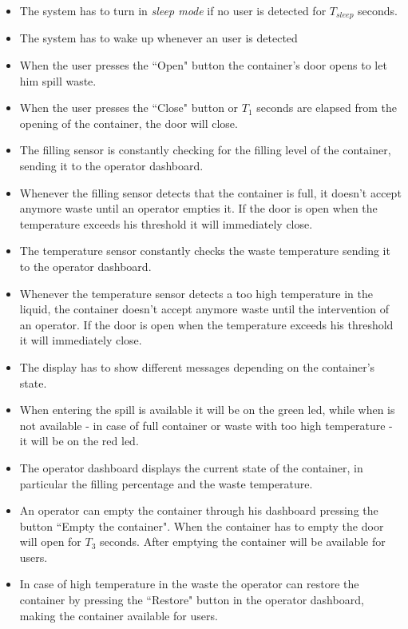 \documentclass[a4paper,12pt]{report}
\begin{document}
            \begin{itemize}
                \item The system has to turn in \textit{sleep mode} if no user is detected for $T_
                {sleep}$ seconds. 
                \item The system has to wake up whenever an user is detected
                \item When the user presses the ``Open" button the container's door opens to let him spill waste.
                \item When the user presses the ``Close" button or $T_1$ seconds are elapsed from the opening of the container, the door will close. 
                \item The filling sensor is constantly checking for the filling level of the container, sending it to the operator dashboard. 
                \item Whenever the filling sensor detects that the container is full, it doesn't accept anymore waste until an operator empties it. If the door is open when the temperature exceeds his threshold it will immediately close. 
                \item The temperature sensor constantly checks the waste temperature sending it to the operator dashboard. 
                \item Whenever the temperature sensor detects a too high temperature in the liquid, the container doesn't accept anymore waste until the intervention of an operator. If the door is open when the temperature exceeds his threshold it will immediately close. 
                \item The display has to show different messages depending on the container's state. 
                \item When entering the spill is available it will be on the green led, while when is not available - in case of full container or waste with too high temperature - it will be on the red led.  
                \item The operator dashboard displays the current state of the container, in particular the filling percentage and the waste temperature. 
                \item An operator can empty the container through his dashboard pressing the button ``Empty the container". When the container has to empty the door will open for $T_3$ seconds. After emptying the container will be available for users. 
                \item In case of high temperature in the waste the operator can restore the container by pressing the ``Restore" button in the operator dashboard, making the container available for users.
            \end{itemize}
\end{document}
